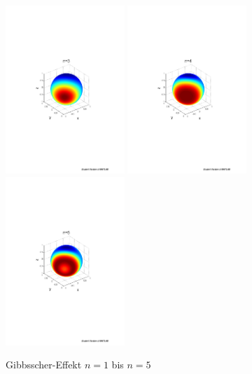 \begin{refsection}
\begin{figure}
\includegraphics[width=0.4\textwidth]{kugel/Gibbs/GibbsN_3.pdf}
\includegraphics[width=0.4\textwidth]{kugel/Gibbs/GibbsN_4.pdf}
\includegraphics[width=0.4\textwidth]{kugel/Gibbs/GibbsN_5.pdf}
\caption{Gibbsscher-Effekt $n=1$ bis $n=5$
\label{skript:Gibbs1}}
\end{figure}


\end{refsection}
